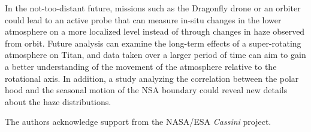 \documentclass[apj,tighten]{emulateapj}
\begin{document}
In the not-too-distant future, missions such as the Dragonfly drone or an orbiter \citep{lorenz2018dragonfly, barnes2021science} could lead to an active probe that can measure in-situ changes in the lower atmosphere on a more localized level instead of through changes in haze observed from orbit. Future analysis can examine the long-term effects of a super-rotating atmosphere on Titan, and data taken over a larger period of time can aim to gain a better understanding of the movement of the atmosphere relative to the rotational axis. In addition, a study analyzing the correlation between the polar hood and the seasonal motion of the NSA boundary could reveal new details about the haze distributions. 

\acknowledgements

The authors acknowledge support from the NASA/ESA \emph{Cassini} project.


\end{document}
